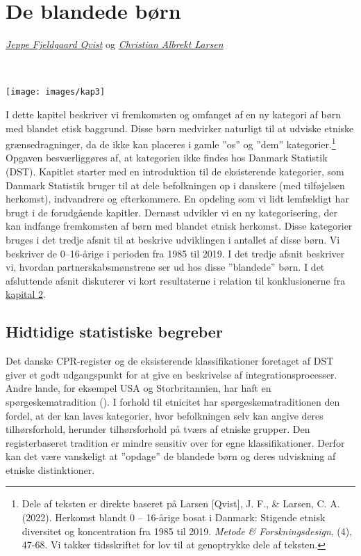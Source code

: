 \documentclass[
]{book}
\begin{document}
\newpage
\thispagestyle{empty}

\chapter{De blandede børn}\label{kap3}

\thispagestyle{empty}

\emph{\href{https://vbn.aau.dk/da/persons/jeppefl}{Jeppe Fjeldgaard Qvist}} og \emph{\href{https://vbn.aau.dk/en/persons/albrekt}{Christian Albrekt Larsen}}

~~~~

\texttt{[image: images/kap3]}

\newpage

I dette kapitel beskriver vi fremkomsten og omfanget af en ny kategori af børn med blandet etisk baggrund. Disse børn medvirker naturligt til at udviske etniske grænsedragninger, da de ikke kan placeres i gamle ''os'' og ''dem'' kategorier.\footnote{Dele af teksten er direkte baseret på Larsen {[}Qvist{]}, J. F., \& Larsen, C. A. (2022). Herkomst blandt 0 -- 16-årige bosat i Danmark: Stigende etnisk diversitet og koncentration fra 1985 til 2019. \emph{Metode \& Forskningsdesign}, (4), 47-68. Vi takker tidsskriftet for lov til at genoptrykke dele af teksten.} Opgaven besværliggøres af, at kategorien ikke findes hos Danmark Statistik (DST). Kapitlet starter med en introduktion til de eksisterende kategorier, som Danmark Statistik bruger til at dele befolkningen op i danskere (med tilføjelsen herkomst), indvandrere og efterkommere. En opdeling som vi lidt lemfældigt har brugt i de forudgående kapitler. Dernæst udvikler vi en ny kategorisering, der kan indfange fremkomsten af børn med blandet etnisk herkomst. Disse kategorier bruges i det tredje afsnit til at beskrive udviklingen i antallet af disse børn. Vi beskriver de 0--16-årige i perioden fra 1985 til 2019. I det tredje afsnit beskriver vi, hvordan partnerskabsmønstrene ser ud hos disse ''blandede'' børn. I det afsluttende afsnit diskuterer vi kort resultaterne i relation til konklusionerne fra \hyperref[kap2]{kapital 2}.

\section{Hidtidige statistiske begreber}\label{hidtidige-statistiske-begreber}

Det danske CPR-register og de eksisterende klassifikationer foretaget af DST giver et godt udgangspunkt for at give en beskrivelse af integrationsprocesser. Andre lande, for eksempel USA og Storbritannien, har haft en spørgeskematradition (). I forhold til etnicitet har spørgeskematraditionen den fordel, at der kan laves kategorier, hvor befolkningen selv kan angive deres tilhørsforhold, herunder tilhørsforhold på tværs af etniske grupper. Den registerbaseret tradition er mindre sensitiv over for egne klassifikationer. Derfor kan det være vanskeligt at ''opdage'' de blandede børn og deres udviskning af etniske distinktioner.
\end{document}
